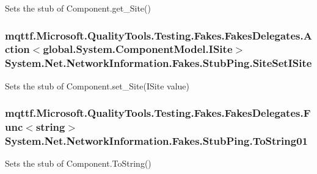 Sets the stub of Component.\-get\-\_\-\-Site()

\hypertarget{class_system_1_1_net_1_1_network_information_1_1_fakes_1_1_stub_ping_a56adb19964b0e6f268cce68f79d5ba44}{
\subsubsection[{Site\-Set\-I\-Site}]{\setlength{\rightskip}{0pt plus 5cm}mqttf.\-Microsoft.\-Quality\-Tools.\-Testing.\-Fakes.\-Fakes\-Delegates.\-Action$<$global.\-System.\-Component\-Model.\-I\-Site$>$ System.\-Net.\-Network\-Information.\-Fakes.\-Stub\-Ping.\-Site\-Set\-I\-Site}}\label{class_system_1_1_net_1_1_network_information_1_1_fakes_1_1_stub_ping_a56adb19964b0e6f268cce68f79d5ba44}


Sets the stub of Component.\-set\-\_\-\-Site(\-I\-Site value)

\hypertarget{class_system_1_1_net_1_1_network_information_1_1_fakes_1_1_stub_ping_a1af487e190727bff6f199be2871d4561}{
\subsubsection[{To\-String01}]{\setlength{\rightskip}{0pt plus 5cm}mqttf.\-Microsoft.\-Quality\-Tools.\-Testing.\-Fakes.\-Fakes\-Delegates.\-Func$<$string$>$ System.\-Net.\-Network\-Information.\-Fakes.\-Stub\-Ping.\-To\-String01}}\label{class_system_1_1_net_1_1_network_information_1_1_fakes_1_1_stub_ping_a1af487e190727bff6f199be2871d4561}


Sets the stub of Component.\-To\-String()



